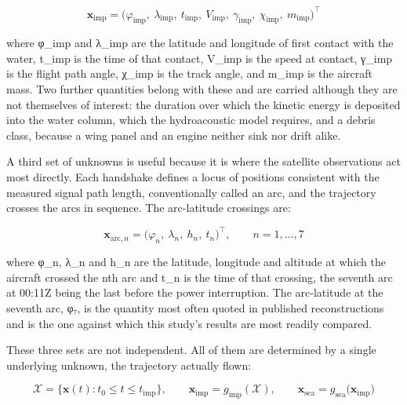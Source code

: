 \documentclass[12pt,a4paper]{article}
\begin{document}
\begin{equation}

\mathbf{x}_{\mathrm{imp}} = \bigl(\varphi_{\mathrm{imp}},\ \lambda_{\mathrm{imp}},\ t_{\mathrm{imp}},\ V_{\mathrm{imp}},\ \gamma_{\mathrm{imp}},\ \chi_{\mathrm{imp}},\ m_{\mathrm{imp}}\bigr)^{\!\top}

\end{equation}

where φ_imp and λ_imp are the latitude and longitude of first contact with the water, t_imp is the time of that contact, V_imp is the speed at contact, γ_imp is the flight path angle, χ_imp is the track angle, and m_imp is the aircraft mass. Two further quantities belong with these and are carried although they are not themselves of interest: the duration over which the kinetic energy is deposited into the water column, which the hydroacoustic model requires, and a debris class, because a wing panel and an engine neither sink nor drift alike.

A third set of unknowns is useful because it is where the satellite observations act most directly. Each handshake defines a locus of positions consistent with the measured signal path length, conventionally called an arc, and the trajectory crosses the arcs in sequence. The arc-latitude crossings are:

\begin{equation}

\mathbf{x}_{\mathrm{arc},n} = \bigl(\varphi_n,\ \lambda_n,\ h_n,\ t_n\bigr)^{\!\top}, \qquad n = 1,\dots,7

\end{equation}

where φ_n, λ_n and h_n are the latitude, longitude and altitude at which the aircraft crossed the nth arc and t_n is the time of that crossing, the seventh arc at 00:11Z being the last before the power interruption. The arc-latitude at the seventh arc, φ₇, is the quantity most often quoted in published reconstructions and is the one against which this study's results are most readily compared.

These three sets are not independent. All of them are determined by a single underlying unknown, the trajectory actually flown:

\begin{equation}

\mathcal{X} = \bigl\{\mathbf{x}(t) : t_0 \le t \le t_{\mathrm{imp}}\bigr\},\qquad \mathbf{x}_{\mathrm{imp}} = g_{\mathrm{imp}}(\mathcal{X}),\qquad \mathbf{x}_{\mathrm{sea}} = g_{\mathrm{sea}}\bigl(\mathbf{x}_{\mathrm{imp}}\bigr)

\end{equation}
\end{document}
